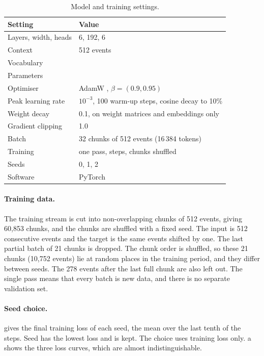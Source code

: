 \documentclass[11pt]{article}
\begin{document}
\begin{table}[h]
\centering\small
\begin{tabular}{ll}
\toprule
Setting & Value \\
\midrule
Layers, width, heads & 6, 192, 6 \\
Context & 512 events \\
Vocabulary & \Vocab{} \\
Parameters & \Params{} \\
Optimiser & AdamW \citep{loshchilov2019}, $\beta=(0.9,0.95)$ \\
Peak learning rate & $10^{-3}$, 100 warm-up steps, cosine decay to 10\% \\
Weight decay & 0.1, on weight matrices and embeddings only \\
Gradient clipping & 1.0 \\
Batch & 32 chunks of 512 events (16\,384 tokens) \\
Training & one pass, \Steps{} steps, chunks shuffled \\
Seeds & 0, 1, 2 \\
Software & PyTorch \citep{paszke2019} \\
\bottomrule
\end{tabular}
\caption{Model and training settings.}
\label{tab:hyper}
\end{table}

\paragraph{Training data.}
The training stream is cut into non-overlapping chunks of 512 events, giving 60{,}853 chunks, and the chunks are shuffled with a fixed seed.
The input is 512 consecutive events and the target is the same events shifted by one.
The last partial batch of 21 chunks is dropped.
The chunk order is shuffled, so these 21 chunks (10{,}752 events) lie at random places in the training period, and they differ between seeds.
The 278 events after the last full chunk are also left out.
The single pass means that every batch is new data, and there is no separate validation set.

\paragraph{Seed choice.}
 gives the final training loss of each seed, the mean over the last tenth of the steps.
Seed \SeedBest{} has the lowest loss and is kept.
The choice uses training loss only.
a shows the three loss curves, which are almost indistinguishable.
\end{document}
